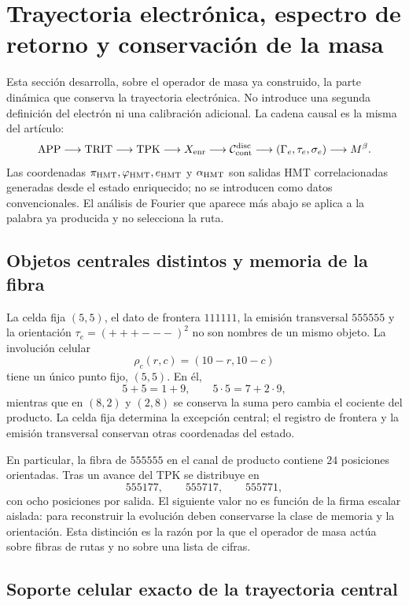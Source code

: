 \section{Trayectoria electrónica, espectro de retorno y conservación de la masa}
\label{vi:sec:trayectoria-espectral-masa}

Esta sección desarrolla, sobre el operador de masa ya construido, la parte
dinámica que conserva la trayectoria electrónica. No introduce una segunda
definición del electrón ni una calibración adicional. La cadena causal es la
misma del artículo:
\[
 \mathrm{APP}\longrightarrow\mathrm{TRIT}\longrightarrow\mathrm{TPK}
 \longrightarrow X_{\rm enr}
 \longrightarrow\mathcal C_{\rm cont}^{\rm disc}
 \longrightarrow (\Gamma_e,\tau_e,\sigma_e)
 \longrightarrow M^\beta .
\]
Las coordenadas $\pi_{\rm HMT},\varphi_{\rm HMT},e_{\rm HMT}$ y
$\alpha_{\rm HMT}$ son salidas HMT correlacionadas generadas desde el estado
enriquecido; no se introducen como datos convencionales. El análisis de Fourier
que aparece más abajo se aplica a la palabra ya producida y no selecciona la ruta.

\subsection{Objetos centrales distintos y memoria de la fibra}

La celda fija $(5,5)$, el dato de frontera $111111$, la emisión transversal
$555555$ y la orientación $\tau_e=(+++---)^2$ no son nombres de un mismo
objeto. La involución celular
\[
 \rho_c(r,c)=(10-r,10-c)
\]
tiene un único punto fijo, $(5,5)$. En él,
\[
 5+5=1+9,\qquad 5\cdot5=7+2\cdot9,
\]
mientras que en $(8,2)$ y $(2,8)$ se conserva la suma pero cambia el cociente
del producto. La celda fija determina la excepción central; el registro de
frontera y la emisión transversal conservan otras coordenadas del estado.

En particular, la fibra de $555555$ en el canal de producto contiene
$24$ posiciones orientadas. Tras un avance del TPK se distribuye en
\[
 555177,\qquad 555717,\qquad 555771,
\]
con ocho posiciones por salida. El siguiente valor no es función de la firma
escalar aislada: para reconstruir la evolución deben conservarse la clase de
memoria y la orientación. Esta distinción es la razón por la que el operador
de masa actúa sobre fibras de rutas y no sobre una lista de cifras.

\subsection{Soporte celular exacto de la trayectoria central}

